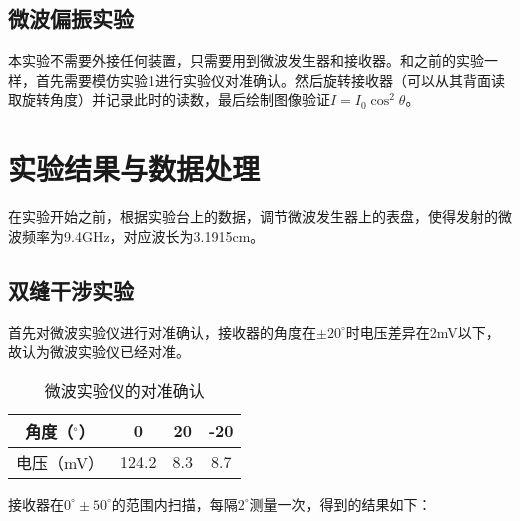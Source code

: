 \documentclass[12pt]{article}
\begin{document}
\subsection{微波偏振实验}
本实验不需要外接任何装置，只需要用到微波发生器和接收器。和之前的实验一样，首先需要模仿实验1进行实验仪对准确认。然后旋转接收器（可以从其背面读取旋转角度）并记录此时的读数，最后绘制图像验证$I=I_0\cos^2\theta$。

\section{实验结果与数据处理}
在实验开始之前，根据实验台上的数据，调节微波发生器上的表盘，使得发射的微波频率为9.4GHz，对应波长为3.1915cm。

\subsection{双缝干涉实验}
首先对微波实验仪进行对准确认，接收器的角度在$\pm20^\circ$时电压差异在2mV以下，故认为微波实验仪已经对准。

\begin{table}[htbp]
    \centering
    \begin{tabular}{|c|c|c|c|}
    \hline
    角度（$^\circ$） & 0     & 20  & -20 \\ \hline
    电压（mV）       & 124.2 & 8.3 & 8.7 \\ \hline
    \end{tabular}
    \caption{微波实验仪的对准确认}
\end{table}

接收器在$0^\circ\pm50^\circ$的范围内扫描，每隔$2^\circ$测量一次，得到的结果如下：
\end{document}
